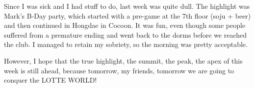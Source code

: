 \begin{post}
\begin{content}
Since I was sick and I had stuff to do, last week was quite dull. The highlight was Mark's B-Day party, which started with a pre-game at the 7th floor (soju + beer) and then continued in Hongdae in Cocoon. It was fun, even though some people suffered from a premature ending and went back to the dorms before we reached the club. I managed to retain my sobriety, so the morning was pretty acceptable.
	
However, I hope that the true highlight, the summit, the peak, the apex of this week is still ahead, because tomorrow, my friends, tomorrow we are going to conquer the LOTTE WORLD!


	\end{content}
\end{post}
